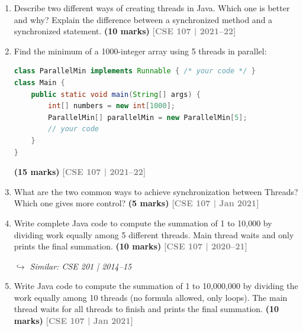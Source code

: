 \documentclass[12pt,a3paper]{article}
\newcommand{\yr}[1]{\hfill\textcolor{gray}{\small\textbf{[#1]}}}
\newcommand{\mk}[1]{\textcolor{orange!70!black}{\small\textbf{(#1 marks)}}}
\newcommand{\variant}[1]{\par\vspace{1pt}\textcolor{blue!50!black}%
  {\footnotesize\textit{$\hookrightarrow$ Similar: #1}}}
\begin{document}
\begin{enumerate}



\item Describe two different ways of creating threads in Java. Which one is better and why? Explain the difference between a synchronized method and a synchronized statement. \mk{10}
\yr{CSE 107 | 2021--22}




\item Find the minimum of a 1000-integer array using 5 threads in parallel:
\begin{lstlisting}[language=Java]
class ParallelMin implements Runnable { /* your code */ }
class Main {
    public static void main(String[] args) {
        int[] numbers = new int[1000];
        ParallelMin[] parallelMin = new ParallelMin[5];
        // your code
    }
}
\end{lstlisting}
\mk{15}
\yr{CSE 107 | 2021--22}




\item What are the two common ways to achieve synchronization between Threads? Which one gives more control? \mk{5}
\yr{CSE 107 | Jan 2021}




\item Write complete Java code to compute the summation of 1 to 10{,}000 by dividing work equally among 5 different threads. Main thread waits and only prints the final summation. \mk{10}
\yr{CSE 107 | 2020--21}
\variant{CSE 201 | 2014--15}




\item Write Java code to compute the summation of 1 to 10{,}000{,}000 by dividing the work equally among 10 threads (no formula allowed, only loops). The main thread waits for all threads to finish and prints the final summation. \mk{10}
\yr{CSE 107 | Jan 2021}





\end{enumerate}
\end{document}
